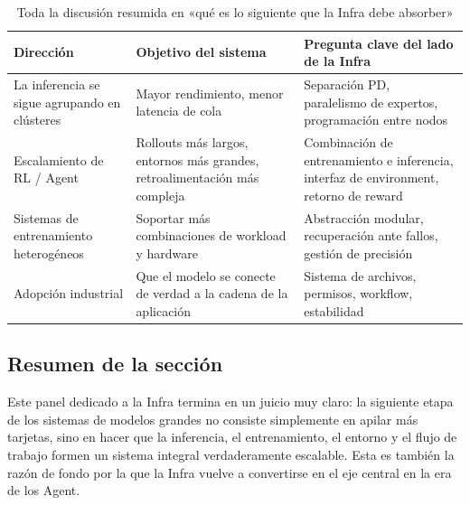 \begin{table}[H]
\centering
\begin{tabular}{p{2.8cm}p{4.2cm}p{4.4cm}}
\toprule
\textbf{Dirección} & \textbf{Objetivo del sistema} & \textbf{Pregunta clave del lado de la Infra} \\
\midrule
La inferencia se sigue agrupando en clústeres & Mayor rendimiento, menor latencia de cola & Separación PD, paralelismo de expertos, programación entre nodos \\
Escalamiento de RL / Agent & Rollouts más largos, entornos más grandes, retroalimentación más compleja & Combinación de entrenamiento e inferencia, interfaz de environment, retorno de reward \\
Sistemas de entrenamiento heterogéneos & Soportar más combinaciones de workload y hardware & Abstracción modular, recuperación ante fallos, gestión de precisión \\
Adopción industrial & Que el modelo se conecte de verdad a la cadena de la aplicación & Sistema de archivos, permisos, workflow, estabilidad \\
\bottomrule
\end{tabular}
\caption{Toda la discusión resumida en «qué es lo siguiente que la Infra debe absorber»}
\end{table}

\subsection{Resumen de la sección}
Este panel dedicado a la Infra termina en un juicio muy claro: la siguiente etapa de los sistemas de modelos grandes no consiste simplemente en apilar más tarjetas, sino en hacer que la inferencia, el entrenamiento, el entorno y el flujo de trabajo formen un sistema integral verdaderamente escalable. Esta es también la razón de fondo por la que la Infra vuelve a convertirse en el eje central en la era de los Agent.
